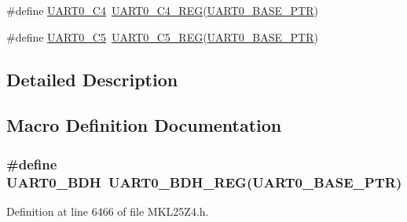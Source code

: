 \begin{DoxyCompactItemize}
\#define \hyperlink{group___u_a_r_t0___register___accessor___macros_ga872dbf2a778697ea6e01a2d8a8b08869}{U\+A\+R\+T0\+\_\+\+C4}~\hyperlink{group___u_a_r_t0___register___accessor___macros_gabc4a3f220e1d978c3fcca2b38a1fc599}{U\+A\+R\+T0\+\_\+\+C4\+\_\+\+R\+EG}(\hyperlink{group___u_a_r_t0___peripheral_ga50a02c91ffbd11fa7b4f0c33fe585199}{U\+A\+R\+T0\+\_\+\+B\+A\+S\+E\+\_\+\+P\+TR})
\item 
\#define \hyperlink{group___u_a_r_t0___register___accessor___macros_ga68f548f83ee16efb6cdd0cd5c37ebed3}{U\+A\+R\+T0\+\_\+\+C5}~\hyperlink{group___u_a_r_t0___register___accessor___macros_ga852f349be956e4aa40d470695a17b7c0}{U\+A\+R\+T0\+\_\+\+C5\+\_\+\+R\+EG}(\hyperlink{group___u_a_r_t0___peripheral_ga50a02c91ffbd11fa7b4f0c33fe585199}{U\+A\+R\+T0\+\_\+\+B\+A\+S\+E\+\_\+\+P\+TR})
\end{DoxyCompactItemize}


\subsection{Detailed Description}


\subsection{Macro Definition Documentation}
\subsubsection[{\texorpdfstring{U\+A\+R\+T0\+\_\+\+B\+DH}{UART0_BDH}}]{\setlength{\rightskip}{0pt plus 5cm}\#define U\+A\+R\+T0\+\_\+\+B\+DH~{\bf U\+A\+R\+T0\+\_\+\+B\+D\+H\+\_\+\+R\+EG}({\bf U\+A\+R\+T0\+\_\+\+B\+A\+S\+E\+\_\+\+P\+TR})}\hypertarget{group___u_a_r_t0___register___accessor___macros_ga0f086bea96574c5a4b90ff7ce1a99256}{}\label{group___u_a_r_t0___register___accessor___macros_ga0f086bea96574c5a4b90ff7ce1a99256}


Definition at line 6466 of file M\+K\+L25\+Z4.\+h.

